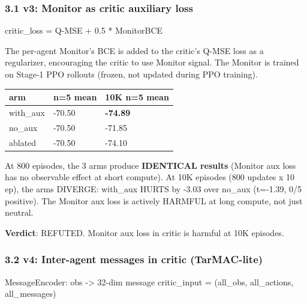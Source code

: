 \documentclass[
]{article}
\newenvironment{Shaded}{}{}
\newcommand{\DecValTok}[1]{\textcolor[rgb]{0.25,0.63,0.44}{#1}}
\newcommand{\FloatTok}[1]{\textcolor[rgb]{0.25,0.63,0.44}{#1}}
\newcommand{\NormalTok}[1]{#1}
\newcommand{\OperatorTok}[1]{\textcolor[rgb]{0.40,0.40,0.40}{#1}}
\newcounter{none} %
\begin{document}
\subsubsection{3.1 v3: Monitor as critic auxiliary
loss}\label{v3-monitor-as-critic-auxiliary-loss}

\begin{Shaded}
\begin{Highlighting}[]
\NormalTok{critic\_loss }\OperatorTok{=}\NormalTok{ Q}\OperatorTok{{-}}\NormalTok{MSE }\OperatorTok{+} \FloatTok{0.5} \OperatorTok{*}\NormalTok{ MonitorBCE}
\end{Highlighting}
\end{Shaded}

The per-agent Monitor's BCE is added to the critic's Q-MSE loss as a
regularizer, encouraging the critic to use Monitor signal. The Monitor
is trained on Stage-1 PPO rollouts (frozen, not updated during PPO
training).

{\def\LTcaptype{none} %
\begin{longtable}[]{@{}lll@{}}
\toprule\noalign{}
arm & n=5 mean & 10K n=5 mean \\
\midrule\noalign{}
\endhead
\bottomrule\noalign{}
\endlastfoot
with\_aux & -70.50 & \textbf{-74.89} \\
no\_aux & -70.50 & -71.85 \\
ablated & -70.50 & -74.10 \\
\end{longtable}
}

At 800 episodes, the 3 arms produce \textbf{IDENTICAL results} (Monitor
aux loss has no observable effect at short compute). At 10K episodes
(800 updates x 10 ep), the arms DIVERGE: with\_aux HURTS by -3.03 over
no\_aux (t=-1.39, 0/5 positive). The Monitor aux loss is actively
HARMFUL at long compute, not just neutral.

\textbf{Verdict}: REFUTED. Monitor aux loss in critic is harmful at 10K
episodes.

\subsubsection{3.2 v4: Inter-agent messages in critic
(TarMAC-lite)}\label{v4-inter-agent-messages-in-critic-tarmac-lite}

\begin{Shaded}
\begin{Highlighting}[]
\NormalTok{MessageEncoder: obs }\OperatorTok{{-}\textgreater{}} \DecValTok{32}\OperatorTok{{-}}\NormalTok{dim message}
\NormalTok{critic\_input }\OperatorTok{=}\NormalTok{ (all\_obs, all\_actions, all\_messages)}
\end{Highlighting}
\end{Shaded}
\end{document}
